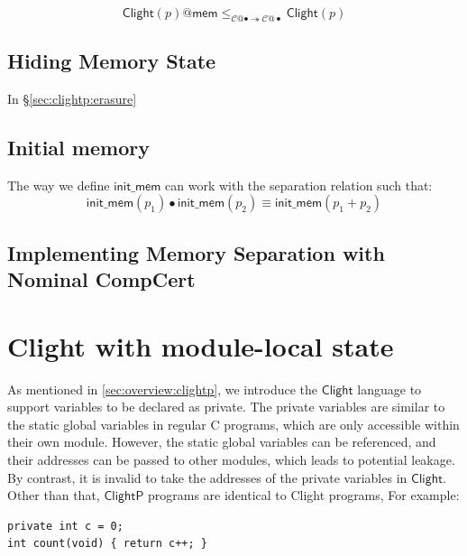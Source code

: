 \documentclass[acmsmall,screen,review,anonymous]{acmart}
\newcommand{\kw}[1]{\ensuremath{ \mathsf{#1} }}
\newcommand{\ClightP}{\ensuremath{ \mathsf{ClightP} }}
\newcommand{\Clight}{\ensuremath{ \mathsf{Clight} }}
\begin{document}
\begin{lemma}
\[
  \Clight(p)@\kw{mem}
  \le_{\mathcal{C}@{\bullet} \twoheadrightarrow \mathcal{C}@{\bullet}}
  \Clight(p)
\]
\end{lemma}


\subsection{Hiding Memory State} %

In \S\ref{sec:clightp:erasure}



\subsection{Initial memory} %

The way we define $\kw{init\_mem}$ can work with the
separation relation such that:
\[
  \kw{init\_mem}(p_1) \bullet \kw{init\_mem}(p_2) \equiv
  \kw{init\_mem}(p_1 + p_2)
\]


\subsection{Implementing Memory Separation with Nominal CompCert} %



\section{Clight with module-local state} \label{sec:clightp} %

As mentioned in \ref{sec:overview:clightp},
we introduce the \Clight{} language to support variables to be
declared as private.
The private variables are similar to the static global variables
in regular C programs, which are only accessible
within their own module.
However, the static global variables can be referenced,
and their addresses can be passed to other modules,
which leads to potential leakage.
By contrast, it is invalid to take the addresses of the private variables
in \Clight{}.
Other than that,
\ClightP{} programs are identical to Clight programs,
For example:

\begin{verbatim}
private int c = 0;
int count(void) { return c++; }
\end{verbatim}
\end{document}
